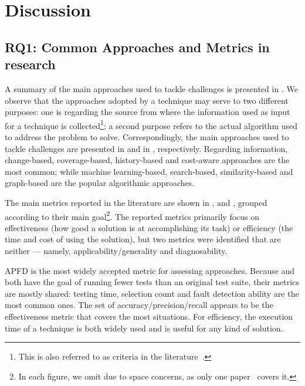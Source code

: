 \section{Discussion}\label{sec:lit_discussion}

\subsection{RQ1: Common Approaches and Metrics in \rt research}
\label{sec:lit_rq1}

A summary of the main approaches used to tackle \rt challenges is presented in .
We observe that the approaches adopted by a technique may serve to two different purposes:
one is regarding the source from where the information used as input for a technique is collected\footnote{This is also referred to as criteria in the literature~\citep{lou_survey_2018}.}; a second purpose refers to the actual algorithm used to address the problem to solve.
Correspondingly, the main approaches used to tackle \rt challenges are presented in  and in , respectively.
Regarding information, change-based, coverage-based, history-based and cost-aware approaches are the most common; while machine learning-based, search-based, similarity-based and graph-based are the popular algorithmic approaches.

%

The main metrics reported in the literature are shown in ,  and , grouped according to their main goal\footnote{In each figure, we omit \tsa due to space concerns, as only one paper~ covers it.}.
The reported metrics primarily focus on effectiveness (how good a solution is at accomplishing its task) or efficiency (the time and cost of using the solution), but two metrics were identified that are neither --- namely, applicability/generality and diagnosability.

APFD is the most widely accepted metric for assessing \tcp{} approaches.
Because \tcs and \tsr both have the goal of running fewer tests than an original test suite, their metrics are mostly shared: testing time, selection count and fault detection ability are the most common ones.
The set of accuracy/precision/recall appears to be the effectiveness metric that covers the most situations.
For efficiency, the execution time of a technique is both widely used and is useful for any kind of solution.

